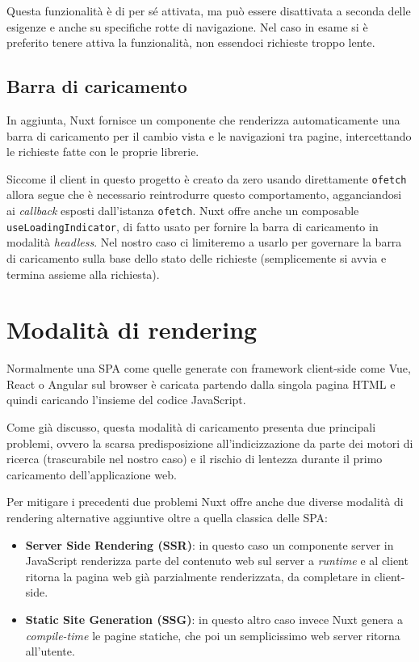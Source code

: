 Questa funzionalità è di per sé attivata, ma può essere disattivata a seconda delle esigenze e anche su specifiche rotte di navigazione. Nel caso in esame si è preferito tenere attiva la funzionalità, non essendoci richieste troppo lente.

\subsection{Barra di caricamento}
In aggiunta, Nuxt fornisce un componente che renderizza automaticamente una barra di caricamento per il cambio vista e le navigazioni tra pagine, intercettando le richieste fatte con le proprie librerie.

Siccome il client in questo progetto è creato da zero usando direttamente \texttt{ofetch} allora segue che è necessario reintrodurre questo comportamento, agganciandosi ai \emph{callback} esposti dall'istanza \texttt{ofetch}. Nuxt offre anche un composable \texttt{useLoadingIndicator}, di fatto usato per fornire la barra di caricamento in modalità \emph{headless}. Nel nostro caso ci limiteremo a usarlo per governare la barra di caricamento sulla base dello stato delle richieste (semplicemente si avvia e termina assieme alla richiesta).

\section{Modalità di rendering}
Normalmente una SPA come quelle generate con framework client-side come Vue, React o Angular sul browser è caricata partendo dalla singola pagina HTML e quindi caricando l'insieme del codice JavaScript.

Come già discusso, questa modalità di caricamento presenta due principali problemi, ovvero la scarsa predisposizione all'indicizzazione da parte dei motori di ricerca (trascurabile nel nostro caso) e il rischio di lentezza durante il primo caricamento dell'applicazione web.

Per mitigare i precedenti due problemi Nuxt offre anche due diverse modalità di rendering alternative aggiuntive oltre a quella classica delle SPA:
\begin{itemize}
    \item \textbf{Server Side Rendering (SSR)}: in questo caso un componente server in JavaScript renderizza parte del contenuto web sul server a \emph{runtime} e al client ritorna la pagina web già parzialmente renderizzata, da completare in client-side.
    \item \textbf{Static Site Generation (SSG)}: in questo altro caso invece Nuxt genera a \emph{compile-time} le pagine statiche, che poi un semplicissimo web server ritorna all'utente.
\end{itemize}

